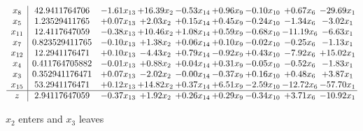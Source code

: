 \documentclass[9pt]{article}
\begin{document}
 \[\begin{array}{c| c c@{\hskip 2pt} c@{\hskip 2pt} c@{\hskip 2pt} c@{\hskip 2pt} c@{\hskip 2pt} c@{\hskip 2pt} c@{\hskip 2pt} }
 x_{8}   &  42.9411764706 & -1.61 x_{13} & + 16.39 x_{2} & -0.53 x_{14} & +  0.96 x_{9} & -0.10 x_{10} & +  0.67 x_{6} & -29.69 x_{1}\\
 x_{5}   &  1.23529411765 & +  0.07 x_{13} & +  2.03 x_{2} & +  0.15 x_{14} & +  0.45 x_{9} & -0.24 x_{10} & -1.34 x_{6} & -3.02 x_{1}\\
 x_{11}   &  12.4117647059 & -0.38 x_{13} & + 10.46 x_{2} & +  1.08 x_{14} & +  0.59 x_{9} & -0.68 x_{10} & -11.19 x_{6} & -6.63 x_{1}\\
 x_{7}   &  0.823529411765 & -0.10 x_{13} & +  1.38 x_{2} & +  0.06 x_{14} & +  0.10 x_{9} & -0.02 x_{10} & -0.25 x_{6} & -1.13 x_{1}\\
 x_{12}   &  12.2941176471 & +  0.10 x_{13} & -4.43 x_{2} & +  0.79 x_{14} & -0.92 x_{9} & +  0.43 x_{10} & -7.92 x_{6} & + 15.02 x_{1}\\
 x_{4}   &  0.411764705882 & -0.01 x_{13} & +  0.88 x_{2} & +  0.04 x_{14} & +  0.31 x_{9} & -0.05 x_{10} & -0.52 x_{6} & -1.83 x_{1}\\
 x_{3}   &  0.352941176471 & +  0.07 x_{13} & -2.02 x_{2} & -0.00 x_{14} & -0.37 x_{9} & +  0.16 x_{10} & +  0.48 x_{6} & +  3.87 x_{1}\\
 x_{15}   &  53.2941176471 & +  0.12 x_{13} & + 14.82 x_{2} & +  0.37 x_{14} & +  6.51 x_{9} & -2.59 x_{10} & -12.72 x_{6} & -57.70 x_{1}\\
\hline
z    &  2.94117647059 & -0.37 x_{13} & +  1.92 x_{2} & +  0.26 x_{14} & +  0.29 x_{9} & -0.34 x_{10} & +  3.71 x_{6} & -10.92 x_{1}\\
\end{array}\]


 $ x_{2} $ enters and $ x_{3} $ leaves 
\end{document}
